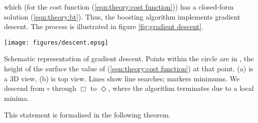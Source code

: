 which (for the cost function (\ref{eqn:theory:cost
function})) has a closed-form solution  (\ref{eqn:theory:bt}).  Thus, the
boosting algorithm implements gradient descent.  The process is
illustrated in figure \ref{fig:gradient descent}.

\begin{linefigure}
\begin{center}
\texttt{[image: figures/descent.epsg]}
\end{center}
\begin{capt}{Schematic representation of gradient descent.}
Points within the circle are in \calH, the height of the surface
the value of (\ref{eqn:theory:cost function}) at that point.  (a) is a
3D view, (b) is top view. Lines show line searches; markers
minimums.  We descend from $\circ$ through $\Box$ to $\Diamond$, where
the algorithm terminates due to a local minima.
\end{capt}
\label{fig:gradient descent}
\end{linefigure}

This statement is formalised in the following theorem.

